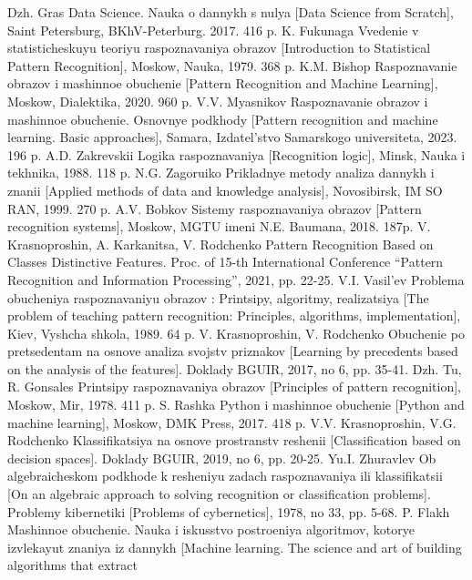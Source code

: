 \documentclass{article}
\begin{document}
\begin{multicols}{2}
\begin{thebibliography}{26}
 Dzh. Gras Data Science. Nauka o dannykh s nulya [Data Science
from Scratch], Saint Petersburg, BKhV-Peterburg. 2017. 416 p.
 K. Fukunaga Vvedenie v statisticheskuyu teoriyu raspoznavaniya
obrazov [Introduction to Statistical Pattern Recognition], Moskow,
Nauka, 1979. 368 p.
 K.M. Bishop Raspoznavanie obrazov i mashinnoe obuchenie [Pattern Recognition and Machine Learning], Moskow, Dialektika,
2020. 960 p.
 V.V. Myasnikov Raspoznavanie obrazov i mashinnoe obuchenie.
Osnovnye podkhody [Pattern recognition and machine learning.
Basic approaches], Samara, Izdatel’stvo Samarskogo universiteta,
2023. 196 p.
 A.D. Zakrevskii Logika raspoznavaniya [Recognition logic],
Minsk, Nauka i tekhnika, 1988. 118 p.
 N.G. Zagoruiko Prikladnye metody analiza dannykh i znanii
[Applied methods of data and knowledge analysis], Novosibirsk,
IM SO RAN, 1999. 270 p.
 A.V. Bobkov Sistemy raspoznavaniya obrazov [Pattern recognition systems], Moskow, MGTU imeni N.E. Baumana, 2018. 187p.
 V. Krasnoproshin, A. Karkanitsa, V. Rodchenko Pattern Recognition Based on Classes Distinctive Features. Proc. of 15-th
International Conference “Pattern Recognition and Information
Processing”, 2021, pp. 22-25.
 V.I. Vasil’ev Problema obucheniya raspoznavaniyu obrazov :
Printsipy, algoritmy, realizatsiya [The problem of teaching pattern recognition: Principles, algorithms, implementation], Kiev,
Vyshcha shkola, 1989. 64 p.
 V. Krasnoproshin, V. Rodchenko Obuchenie po pretsedentam na
osnove analiza svojstv priznakov [Learning by precedents based
on the analysis of the features]. Doklady BGUIR, 2017, no 6, pp.
35-41.
 Dzh. Tu, R. Gonsales Printsipy raspoznavaniya obrazov [Principles of pattern recognition], Moskow, Mir, 1978. 411 p.
 S. Rashka Python i mashinnoe obuchenie [Python and machine
learning], Moskow, DMK Press, 2017. 418 p.
 V.V. Krasnoproshin, V.G. Rodchenko Klassifikatsiya na osnove
prostranstv reshenii [Classification based on decision spaces].
Doklady BGUIR, 2019, no 6, pp. 20-25.
 Yu.I. Zhuravlev Ob algebraicheskom podkhode k resheniyu
zadach raspoznavaniya ili klassifikatsii [On an algebraic approach
to solving recognition or classification problems]. Problemy kibernetiki [Problems of cybernetics], 1978, no 33, pp. 5-68.
 P. Flakh Mashinnoe obuchenie. Nauka i iskusstvo postroeniya
algoritmov, kotorye izvlekayut znaniya iz dannykh [Machine
learning. The science and art of building algorithms that extract

\end{thebibliography}
\end{multicols}
\end{document}
